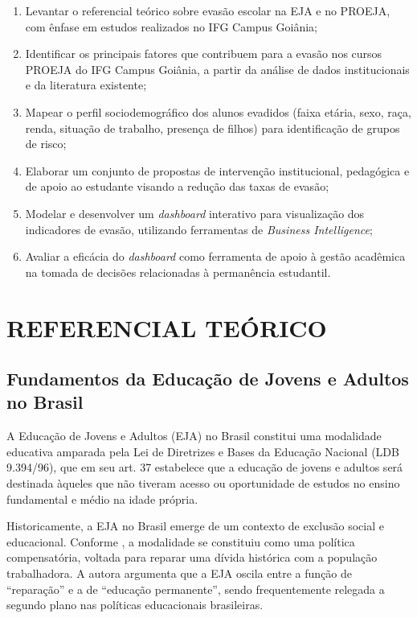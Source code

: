 \documentclass[12pt,a4paper]{article}
\begin{document}
\begin{enumerate}[leftmargin=1.25cm]
    \item Levantar o referencial teórico sobre evasão escolar na EJA e no PROEJA, com ênfase em estudos realizados no IFG Campus Goiânia;
    \item Identificar os principais fatores que contribuem para a evasão nos cursos PROEJA do IFG Campus Goiânia, a partir da análise de dados institucionais e da literatura existente;
    \item Mapear o perfil sociodemográfico dos alunos evadidos (faixa etária, sexo, raça, renda, situação de trabalho, presença de filhos) para identificação de grupos de risco;
    \item Elaborar um conjunto de propostas de intervenção institucional, pedagógica e de apoio ao estudante visando a redução das taxas de evasão;
    \item Modelar e desenvolver um \textit{dashboard} interativo para visualização dos indicadores de evasão, utilizando ferramentas de \textit{Business Intelligence};
    \item Avaliar a eficácia do \textit{dashboard} como ferramenta de apoio à gestão acadêmica na tomada de decisões relacionadas à permanência estudantil.
\end{enumerate}

\section{REFERENCIAL TEÓRICO}

\subsection{Fundamentos da Educação de Jovens e Adultos no Brasil}

A Educação de Jovens e Adultos (EJA) no Brasil constitui uma modalidade educativa amparada pela Lei de Diretrizes e Bases da Educação Nacional (LDB 9.394/96), que em seu art. 37 estabelece que a educação de jovens e adultos será destinada àqueles que não tiveram acesso ou oportunidade de estudos no ensino fundamental e médio na idade própria.

Historicamente, a EJA no Brasil emerge de um contexto de exclusão social e educacional. Conforme , a modalidade se constituiu como uma política compensatória, voltada para reparar uma dívida histórica com a população trabalhadora. A autora argumenta que a EJA oscila entre a função de ``reparação'' e a de ``educação permanente'', sendo frequentemente relegada a segundo plano nas políticas educacionais brasileiras.
\end{document}
